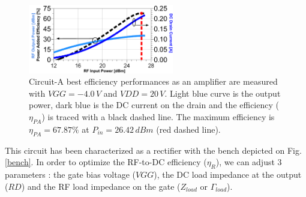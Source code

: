 \documentclass[conference]{IEEEtran}
\begin{document}
\begin{figure}[ht!] %
\centering
\includegraphics[width=2.5in]{IMS2014_Mike_Amplifier.pdf}
\caption{ Circuit-A best efficiency performances as an amplifier are measured with $VGG=-4.0\,V$ and $VDD=20\,V$. Light blue curve is the output power, dark blue is the DC current on the drain and the efficiency ($\eta_{PA}$) is traced with a black dashed line. The maximum efficiency is $\eta_{PA}=67.87\%$ at $P_{in}=26.42\,dBm$ (red dashed line).}
\label{mike_amp}
\end{figure}

This circuit has been characterized as a rectifier with the bench depicted on Fig. \ref{bench}. In order to optimize the RF-to-DC efficiency ($\eta_R$), we can adjust 3 parameters : the gate bias voltage ($VGG$), the DC load impedance at the output ($RD$) and the RF load impedance on the gate ($Z_{load}$ or $\Gamma_{load}$). \\
\end{document}
